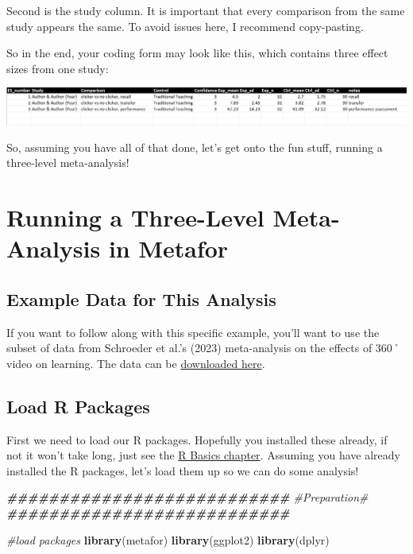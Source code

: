 \documentclass[
]{book}
\newenvironment{Shaded}{\begin{snugshade}}{\end{snugshade}}
\newcommand{\CommentTok}[1]{\textcolor[rgb]{0.56,0.35,0.01}{\textit{#1}}}
\newcommand{\DocumentationTok}[1]{\textcolor[rgb]{0.56,0.35,0.01}{\textbf{\textit{#1}}}}
\newcommand{\FunctionTok}[1]{\textcolor[rgb]{0.13,0.29,0.53}{\textbf{#1}}}
\newcommand{\NormalTok}[1]{#1}
\begin{document}
Second is the study column. It is important that every comparison from the same study appears the same. To avoid issues here, I recommend copy-pasting.

So in the end, your coding form may look like this, which contains three effect sizes from one study:

\includegraphics[width=2\textwidth,height=\textheight]{images/3lmacoding.PNG}

So, assuming you have all of that done, let's get onto the fun stuff, running a three-level meta-analysis!

\hypertarget{running-a-three-level-meta-analysis-in-metafor}{%
\section{Running a Three-Level Meta-Analysis in Metafor}\label{running-a-three-level-meta-analysis-in-metafor}}

\hypertarget{example-data-for-this-analysis-1}{%
\subsection{Example Data for This Analysis}\label{example-data-for-this-analysis-1}}

If you want to follow along with this specific example, you'll want to use the subset of data from Schroeder et al.'s (2023)\citep{schroeder2023} meta-analysis on the effects of 360˚ video on learning. The data can be \href{https://github.com/noah-schroeder/reviewbook/blob/abfdb439ef81267b388ef75067a03262e1e59020/360\%20sample\%20data.csv}{downloaded here}.

\hypertarget{load-r-packages-1}{%
\subsection{Load R Packages}\label{load-r-packages-1}}

First we need to load our R packages. Hopefully you installed these already, if not it won't take long, just see the \protect\hyperlink{rbasics}{R Basics chapter}. Assuming you have already installed the R packages, let's load them up so we can do some analysis!

\begin{Shaded}
\begin{Highlighting}[]
\DocumentationTok{\#\#\#\#\#\#\#\#\#\#\#\#\#\#\#\#\#\#\#\#\#\#\#\#\#\#\#}
\CommentTok{\#Preparation\#}
\DocumentationTok{\#\#\#\#\#\#\#\#\#\#\#\#\#\#\#\#\#\#\#\#\#\#\#\#\#\#\#}

\CommentTok{\#load packages}
\FunctionTok{library}\NormalTok{(metafor)}
\FunctionTok{library}\NormalTok{(ggplot2)}
\FunctionTok{library}\NormalTok{(dplyr)}
\end{Highlighting}
\end{Shaded}
\end{document}

